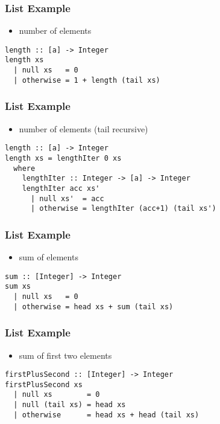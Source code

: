 \documentclass[dvipsnames]{beamer}
\theoremstyle{plain}
\begin{document}
\begin{frame}[fragile]
  \frametitle{List Example}

  \begin{itemize}
    \item number of elements
  \end{itemize}

  \begin{lstlisting}
length :: [a] -> Integer
length xs
  | null xs   = 0
  | otherwise = 1 + length (tail xs)
  \end{lstlisting}
\end{frame}

\begin{frame}[fragile]
  \frametitle{List Example}

  \begin{itemize}
    \item number of elements (tail recursive)
  \end{itemize}

  \begin{lstlisting}
length :: [a] -> Integer
length xs = lengthIter 0 xs
  where
    lengthIter :: Integer -> [a] -> Integer
    lengthIter acc xs'
      | null xs'  = acc
      | otherwise = lengthIter (acc+1) (tail xs')
  \end{lstlisting}
\end{frame}

\begin{frame}[fragile]
  \frametitle{List Example}

  \begin{itemize}
    \item sum of elements
  \end{itemize}

  \begin{lstlisting}
sum :: [Integer] -> Integer
sum xs
  | null xs   = 0
  | otherwise = head xs + sum (tail xs)
  \end{lstlisting}
\end{frame}

\begin{frame}[fragile]
  \frametitle{List Example}

  \begin{itemize}
    \item sum of first two elements
  \end{itemize}

  \begin{lstlisting}
firstPlusSecond :: [Integer] -> Integer
firstPlusSecond xs
  | null xs        = 0
  | null (tail xs) = head xs
  | otherwise      = head xs + head (tail xs)
  \end{lstlisting}
\end{frame}
\end{document}
